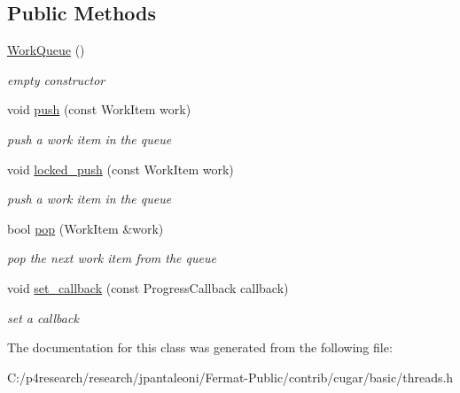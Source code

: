 \subsection*{Public Methods}
\begin{DoxyCompactItemize}
\item 
\mbox{\label{classcugar_1_1_work_queue_aa464fb31a0b0b69df0f19a817d5afb03}} 
\hyperlink{classcugar_1_1_work_queue_aa464fb31a0b0b69df0f19a817d5afb03}{Work\+Queue} ()
\begin{DoxyCompactList}\small\item\em empty constructor \end{DoxyCompactList}\item 
\mbox{\label{classcugar_1_1_work_queue_a1c2a90b956e4c693d3068f0a9ff8e69f}} 
void \hyperlink{classcugar_1_1_work_queue_a1c2a90b956e4c693d3068f0a9ff8e69f}{push} (const Work\+Item work)
\begin{DoxyCompactList}\small\item\em push a work item in the queue \end{DoxyCompactList}\item 
\mbox{\label{classcugar_1_1_work_queue_accd39d4d02c7b0b6481513c863523773}} 
void \hyperlink{classcugar_1_1_work_queue_accd39d4d02c7b0b6481513c863523773}{locked\+\_\+push} (const Work\+Item work)
\begin{DoxyCompactList}\small\item\em push a work item in the queue \end{DoxyCompactList}\item 
\mbox{\label{classcugar_1_1_work_queue_af8de50e138bf9470329060fd7f30e5b6}} 
bool \hyperlink{classcugar_1_1_work_queue_af8de50e138bf9470329060fd7f30e5b6}{pop} (Work\+Item \&work)
\begin{DoxyCompactList}\small\item\em pop the next work item from the queue \end{DoxyCompactList}\item 
\mbox{\label{classcugar_1_1_work_queue_a775926d30fb6b79e6d0bc57fa1dc8420}} 
void \hyperlink{classcugar_1_1_work_queue_a775926d30fb6b79e6d0bc57fa1dc8420}{set\+\_\+callback} (const Progress\+Callback callback)
\begin{DoxyCompactList}\small\item\em set a callback \end{DoxyCompactList}\end{DoxyCompactItemize}


The documentation for this class was generated from the following file\+:\begin{DoxyCompactItemize}
\item 
C\+:/p4research/research/jpantaleoni/\+Fermat-\/\+Public/contrib/cugar/basic/threads.\+h\end{DoxyCompactItemize}
